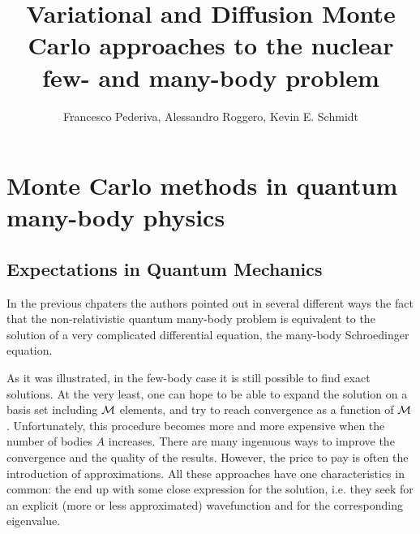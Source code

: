 \title{Variational and Diffusion Monte Carlo approaches to the nuclear few- and many-body problem}
\author{Francesco Pederiva, Alessandro Roggero, Kevin E. Schmidt}
\newcommand{\redd}[1]{\textcolor{red}{#1}}


\maketitle
\abstract{}



\section{Monte Carlo methods in quantum many-body physics}
\subsection{Expectations in Quantum Mechanics}
In the previous chpaters the authors pointed out in several different ways the fact that the non-relativistic quantum many-body problem 
is equivalent to the solution of a very complicated differential equation, the many-body Schroedinger equation.

As it was illustrated, in the few-body case it is still possible to find exact solutions. At the very least, one can
hope to be able to expand the solution on a basis set including $\cal M$ elements,
and try to reach convergence as a function of $\cal M$. Unfortunately, this procedure becomes more and more expensive
when the number of bodies $A$ increases. There are many ingenuous ways to improve the convergence and the
quality of the results. However, the price to pay is often the introduction of approximations.
All these approaches have one characteristics in common: the end up with some close expression for the
solution, i.e. they seek for an explicit (more or less approximated)  wavefunction and for the corresponding
eigenvalue.


